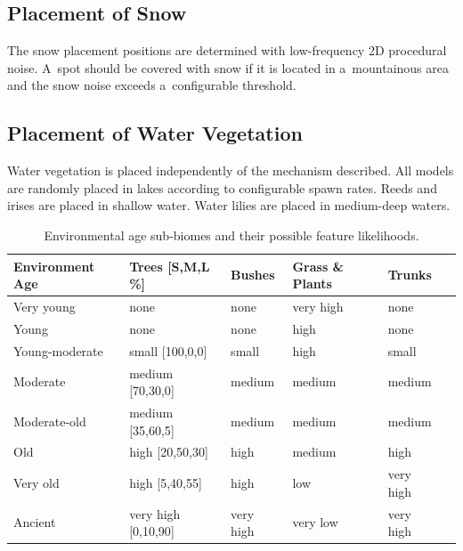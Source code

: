 \subsection{Placement of Snow}
The snow placement positions are determined with low-frequency 2D procedural noise. A~spot should be covered with snow if it is located in a~mountainous area and the snow noise exceeds a~configurable threshold.

\subsection{Placement of Water Vegetation}
Water vegetation is placed independently of the mechanism described. All models are randomly placed in lakes according to configurable spawn rates. Reeds and irises are placed in shallow water. Water lilies are placed in medium-deep waters.

\begin{table}[!h]
    \centering
    \begin{tabular}{l|lllll}
        \textbf{Environment Age} & \textbf{Trees {[}S,M,L \%{]}} & \textbf{Bushes} & \textbf{Grass \& Plants} & \textbf{Trunks} \\ \hline
        Very young               & none                          & none                  & very high          & none            \\
        Young                    & none                          & none                  & high               & none            \\
        Young-moderate           & small {[}100,0,0{]}           & small                 & high               & small           \\
        Moderate                 & medium {[}70,30,0{]}          & medium                & medium             & medium          \\
        Moderate-old             & medium {[}35,60,5{]}          & medium                & medium             & medium          \\
        Old                      & high {[}20,50,30{]}           & high                  & medium             & high            \\
        Very old                 & high {[}5,40,55{]}            & high                  & low                & very high       \\
        Ancient                  & very high {[}0,10,90{]}       & very high             & very low           & very high       \\
    \end{tabular}
    \caption[Environmental Age Biomes and their Feature Likelihoods]{Environmental age sub-biomes and their possible feature likelihoods.}
    \label{tab:environmental_age_effects}
\end{table}

